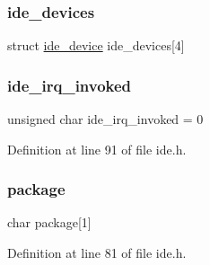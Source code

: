 \subsubsection{\texorpdfstring{ide\+\_\+devices}{ide\_devices}}
{\footnotesize\ttfamily struct \hyperlink{a00073}{ide\+\_\+device}  ide\+\_\+devices\mbox{[}4\mbox{]}}

\mbox{\label{a00005_a12985ec2f925d0cdbd7d24728b9849f9_a12985ec2f925d0cdbd7d24728b9849f9}} 
\subsubsection{\texorpdfstring{ide\+\_\+irq\+\_\+invoked}{ide\_irq\_invoked}}
{\footnotesize\ttfamily unsigned char ide\+\_\+irq\+\_\+invoked = 0\hspace{0.3cm}{\ttfamily [static]}}



Definition at line 91 of file ide.\+h.

\mbox{\label{a00005_ae11222fc133cc5f2cb1b16155fee8b43_ae11222fc133cc5f2cb1b16155fee8b43}} 
\subsubsection{\texorpdfstring{package}{package}}
{\footnotesize\ttfamily char package\mbox{[}1\mbox{]}}



Definition at line 81 of file ide.\+h.

